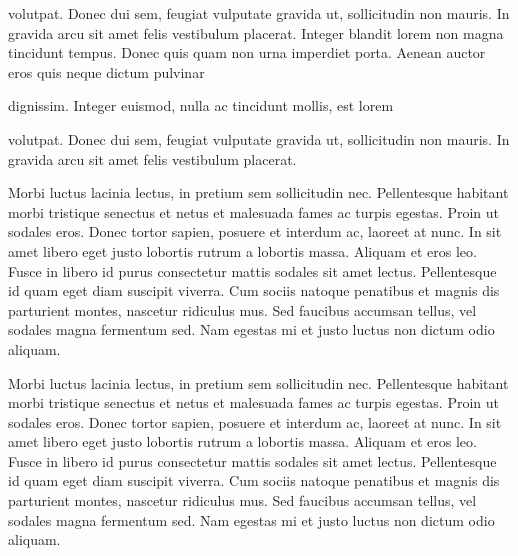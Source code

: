 volutpat. Donec dui sem, feugiat vulputate gravida ut, sollicitudin
non mauris. In gravida arcu sit amet felis vestibulum placerat.
Integer blandit lorem non magna tincidunt tempus. Donec quis quam non
urna imperdiet porta. Aenean auctor eros quis neque dictum pulvinar

dignissim. Integer euismod, nulla ac tincidunt mollis, est lorem

volutpat. Donec dui sem, feugiat vulputate gravida ut, sollicitudin
non mauris. In gravida arcu sit amet felis vestibulum placerat.
\endrule


Morbi luctus lacinia lectus, in pretium sem sollicitudin
nec. Pellentesque habitant morbi tristique senectus et netus et
malesuada fames ac turpis egestas. Proin ut sodales eros. Donec tortor
sapien, posuere et interdum ac, laoreet at nunc. In sit amet libero
eget justo lobortis rutrum a lobortis massa. Aliquam et eros
leo. Fusce in libero id purus consectetur mattis sodales sit amet
lectus. Pellentesque id quam eget diam suscipit viverra. Cum sociis
natoque penatibus et magnis dis parturient montes, nascetur ridiculus
mus. Sed faucibus accumsan tellus, vel sodales magna fermentum
sed. Nam egestas mi et justo luctus non dictum odio aliquam.

Morbi luctus lacinia lectus, in pretium sem sollicitudin
nec. Pellentesque habitant morbi tristique senectus et netus et
malesuada fames ac turpis egestas. Proin ut sodales eros. Donec tortor
sapien, posuere et interdum ac, laoreet at nunc. In sit amet libero
eget justo lobortis rutrum a lobortis massa. Aliquam et eros
leo. Fusce in libero id purus consectetur mattis sodales sit amet
lectus. Pellentesque id quam eget diam suscipit viverra. Cum sociis
natoque penatibus et magnis dis parturient montes, nascetur ridiculus
mus. Sed faucibus accumsan tellus, vel sodales magna fermentum
sed. Nam egestas mi et justo luctus non dictum odio aliquam.



\bye
